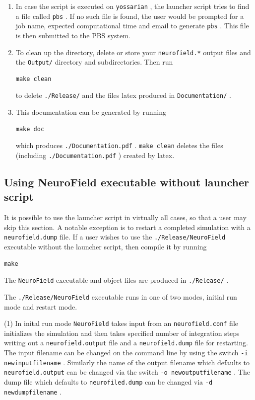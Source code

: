 \documentclass[12pt,a4paper]{article}
\newcommand{\type}[1]{ {\small\small\tt #1} }
\begin{document}
\begin{enumerate}
\item In case the script is executed on \type{yossarian}, the launcher script tries to find a file called \type{pbs}. If no such file is found, the user would be prompted for a job name, expected computational time and email to generate \type{pbs}. This file is then submitted to the PBS system.

\item To clean up the directory, delete or store your \type{neurofield.*} output files and the \type{Output/} directory and subdirectories. Then run
\begin{lstlisting}
make clean
\end{lstlisting}
to delete \type{./Release/} and the files latex produced in \type{Documentation/}.

\item This documentation can be generated by running 
\begin{lstlisting}
make doc
\end{lstlisting}
which produces \type{./Document\-ation.pdf}. \type{make clean} deletes the files (including \type{./Document\-ation.pdf}) created by latex.

\end{enumerate}

\subsection{Using NeuroField executable without launcher script}
\label{sec:exe}

It is possible to use the launcher script in virtually all cases, so that a user may skip this section. A notable exception is to restart a completed simulation with a \type{neurofield.dump} file. If a user wishes to use the \type{./Release/NeuroField} executable without the launcher script, then compile it by running
\begin{lstlisting}
make
\end{lstlisting}
The \type{NeuroField} executable and object files are produced in \type{./Release/}.

The \type{./Release/NeuroField} executable runs in one of two modes, initial run mode and restart mode.

(1) In inital run mode \type{NeuroField} takes input from an \type{neurofield.conf} file initializes the simulation and then takes specified number of integration steps writing out a \type{neurofield.output} file and a \type{neurofield.dump} file for restarting.  The input filename can be changed on the command line by using the switch \type{-i newinputfilename}. Similarly the name of the output filename which defaults to \type{neurofield.output} can be changed via the switch \type{-o newoutputfilename}. The dump file which defaults to \type{neurofiled.dump} can be changed via \type{-d newdumpfilename}.
\end{document}
